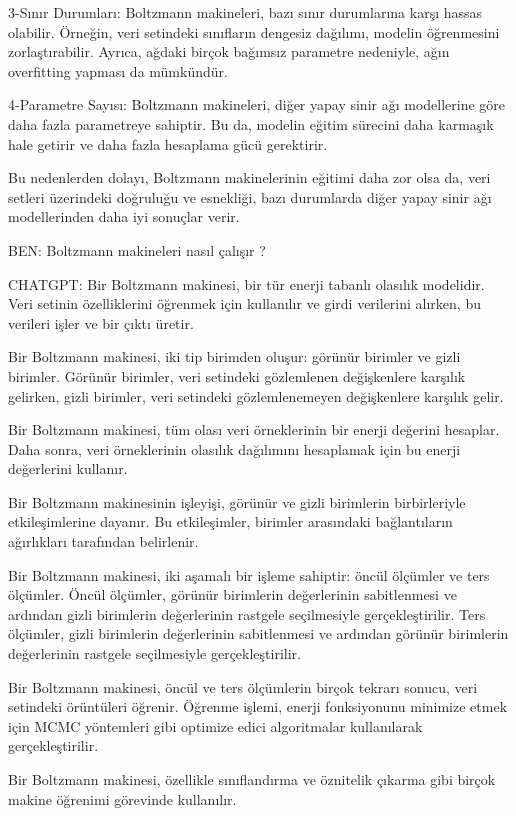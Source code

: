 \documentclass[11pt]{article}
\begin{document}
3-Sınır Durumları: Boltzmann makineleri, bazı sınır durumlarına karşı hassas olabilir. Örneğin, veri setindeki sınıfların dengesiz dağılımı, modelin öğrenmesini zorlaştırabilir. Ayrıca, ağdaki birçok bağımsız parametre nedeniyle, ağın overfitting yapması da mümkündür.

4-Parametre Sayısı: Boltzmann makineleri, diğer yapay sinir ağı modellerine göre daha fazla parametreye sahiptir. Bu da, modelin eğitim sürecini daha karmaşık hale getirir ve daha fazla hesaplama gücü gerektirir.

Bu nedenlerden dolayı, Boltzmann makinelerinin eğitimi daha zor olsa da, veri setleri üzerindeki doğruluğu ve esnekliği, bazı durumlarda diğer yapay sinir ağı modellerinden daha iyi sonuçlar verir.

BEN: Boltzmann makineleri nasıl çalışır ?

CHATGPT: Bir Boltzmann makinesi, bir tür enerji tabanlı olasılık modelidir. Veri setinin özelliklerini öğrenmek için kullanılır ve girdi verilerini alırken, bu verileri işler ve bir çıktı üretir.

Bir Boltzmann makinesi, iki tip birimden oluşur: görünür birimler ve gizli birimler. Görünür birimler, veri setindeki gözlemlenen değişkenlere karşılık gelirken, gizli birimler, veri setindeki gözlemlenemeyen değişkenlere karşılık gelir.

Bir Boltzmann makinesi, tüm olası veri örneklerinin bir enerji değerini hesaplar. Daha sonra, veri örneklerinin olasılık dağılımını hesaplamak için bu enerji değerlerini kullanır.

Bir Boltzmann makinesinin işleyişi, görünür ve gizli birimlerin birbirleriyle etkileşimlerine dayanır. Bu etkileşimler, birimler arasındaki bağlantıların ağırlıkları tarafından belirlenir.

Bir Boltzmann makinesi, iki aşamalı bir işleme sahiptir: öncül ölçümler ve ters ölçümler. Öncül ölçümler, görünür birimlerin değerlerinin sabitlenmesi ve ardından gizli birimlerin değerlerinin rastgele seçilmesiyle gerçekleştirilir. Ters ölçümler, gizli birimlerin değerlerinin sabitlenmesi ve ardından görünür birimlerin değerlerinin rastgele seçilmesiyle gerçekleştirilir.

Bir Boltzmann makinesi, öncül ve ters ölçümlerin birçok tekrarı sonucu, veri setindeki örüntüleri öğrenir. Öğrenme işlemi, enerji fonksiyonunu minimize etmek için MCMC yöntemleri gibi optimize edici algoritmalar kullanılarak gerçekleştirilir.

Bir Boltzmann makinesi, özellikle sınıflandırma ve öznitelik çıkarma gibi birçok makine öğrenimi görevinde kullanılır.
\end{document}

